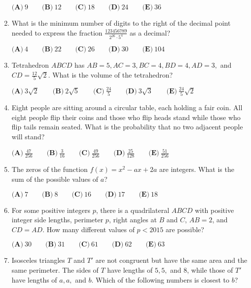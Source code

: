 \documentclass{article}
\begin{document}
\begin{enumerate}[label=\arabic*., itemsep=0.5em]
$\textbf{(A)}\ 9\qquad\textbf{(B)}\ 12\qquad\textbf{(C)}\ 18\qquad\textbf{(D)}\ 24\qquad\textbf{(E)}\ 36$\par \vspace{0.5em}\item What is the minimum number of digits to the right of the decimal point needed to express the fraction $\frac{123456789}{2^{26}\cdot 5^4}$ as a decimal?

$ \textbf{(A)}\ 4\qquad\textbf{(B)}\ 22\qquad\textbf{(C)}\ 26\qquad\textbf{(D)}\ 30\qquad\textbf{(E)}\ 104$\par \vspace{0.5em}\item Tetrahedron $ABCD$ has $AB=5,AC=3,BC=4,BD=4,AD=3,$ and $CD=\frac{12}{5}\sqrt{2}$. What is the volume of the tetrahedron?

$ \textbf{(A)}\ 3\sqrt{2}\qquad\textbf{(B)}\ 2\sqrt{5}\qquad\textbf{(C)}\ \frac{24}{5}\qquad\textbf{(D)}\ 3\sqrt{3}\qquad\textbf{(E)}\ \frac{24}{5}\sqrt{2}$\par \vspace{0.5em}\item Eight people are sitting around a circular table, each holding a fair coin. All eight people flip their coins and those who flip heads stand while those who flip tails remain seated. What is the probability that no two adjacent people will stand?

$ \textbf{(A)}\ \frac{47}{256} \qquad\textbf{(B)}\ \frac{3}{16} \qquad\textbf{(C)}\ \frac{49}{256} \qquad\textbf{(D)}\ \frac{25}{128} \qquad\textbf{(E)}\ \frac{51}{256}$\par \vspace{0.5em}\item The zeros of the function $f(x) = x^2-ax+2a$ are integers. What is the sum of the possible values of $a$?

$ \textbf{(A)}\ 7 \qquad\textbf{(B)}\ 8 \qquad\textbf{(C)}\ 16 \qquad\textbf{(D)}\ 17 \qquad\textbf{(E)}\ 18$\par \vspace{0.5em}\item For some positive integers $p$, there is a quadrilateral $ABCD$ with positive integer side lengths, perimeter $p$, right angles at $B$ and $C$, $AB=2$, and $CD=AD$. How many different values of $p<2015$ are possible?

$ \textbf{(A)}\ 30 \qquad\textbf{(B)}\ 31 \qquad\textbf{(C)}\ 61 \qquad\textbf{(D)}\ 62 \qquad\textbf{(E)}\ 63$\par \vspace{0.5em}\item Isosceles triangles $T$ and $T'$ are not congruent but have the same area and the same perimeter. The sides of $T$ have lengths of $5,5,$ and $8$, while those of $T'$ have lengths of $a,a,$ and $b$. Which of the following numbers is closest to $b$?


\end{enumerate}
\end{document}
